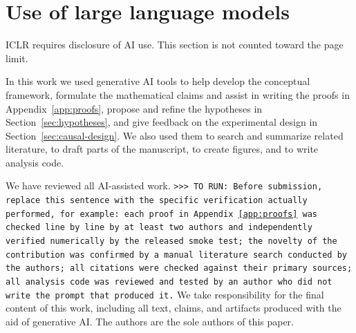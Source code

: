 \documentclass{article}
\newcommand{\TORUN}[1]{{\color{blue}\texttt{>{}>{}> TO RUN: #1}}}
\begin{document}
\section{Use of large language models}
\label{app:ai}

ICLR requires disclosure of AI use. This section is not counted toward the page limit.

In this work we used generative AI tools to help develop the conceptual framework, formulate the
mathematical claims and assist in writing the proofs in Appendix~\ref{app:proofs}, propose and refine
the hypotheses in Section~\ref{sec:hypotheses}, and give feedback on the experimental design in
Section~\ref{sec:causal-design}. We also used them to search and summarize related literature, to
draft parts of the manuscript, to create figures, and to write analysis code.

We have reviewed all AI-assisted work. \TORUN{Before submission, replace this sentence with the
specific verification actually performed, for example: each proof in Appendix~\ref{app:proofs} was
checked line by line by at least two authors and independently verified numerically by the released
smoke test; the novelty of the contribution was confirmed by a manual literature search conducted by
the authors; all citations were checked against their primary sources; all analysis code was reviewed
and tested by an author who did not write the prompt that produced it.} We take responsibility for
the final content of this work, including all text, claims, and artifacts produced with the aid of
generative AI. The authors are the sole authors of this paper.
\end{document}
